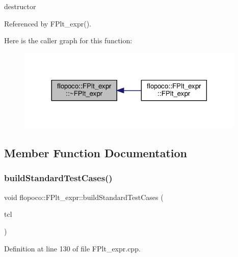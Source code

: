 destructor 



Referenced by F\+Plt\+\_\+expr().

Here is the caller graph for this function\+:
\nopagebreak
\begin{figure}[H]
\begin{center}
\leavevmode
\includegraphics[width=308pt]{df/de9/classflopoco_1_1FPlt__expr_a7ee67e3677aa8fede60ea214e38d0139_icgraph}
\end{center}
\end{figure}


\subsection{Member Function Documentation}
\mbox{\label{classflopoco_1_1FPlt__expr_a523f7687ad0f6477a33cb01825ef3c3a}} 
\subsubsection{\texorpdfstring{build\+Standard\+Test\+Cases()}{buildStandardTestCases()}}
{\footnotesize\ttfamily void flopoco\+::\+F\+Plt\+\_\+expr\+::build\+Standard\+Test\+Cases (\begin{DoxyParamCaption}\item[{Test\+Case\+List $\ast$}]{tcl }\end{DoxyParamCaption})\hspace{0.3cm}{\ttfamily [override]}}



Definition at line 130 of file F\+Plt\+\_\+expr.\+cpp.

\mbox{\label{classflopoco_1_1FPlt__expr_afd9b4ffd16552084979ada3a06c0488e}} 
